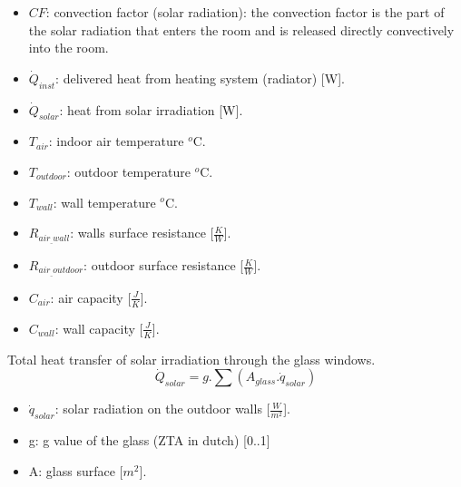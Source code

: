  \begin{itemize}
      \item $CF$: convection factor (solar radiation): the convection factor is the part of the solar radiation that enters the room and is released directly convectively into the room.
      \item $\dot{Q}_{inst}$: delivered heat from heating system (radiator) [W].
      \item $\dot{Q}_{solar}$: heat from solar irradiation [W].
      \item $T_{air}$: indoor air temperature $^o$C.
      \item $T_{outdoor}$: outdoor temperature $^o$C.
      \item $T_{wall}$: wall temperature $^o$C.
      \item $R_{air_{\_}wall}$: walls surface resistance [$\frac{K}{W}$].
      \item $R_{air_{\_}outdoor}$: outdoor surface resistance [$\frac{K}{W}$].
      \item $C_{air}$: air capacity [$\frac{J}{K}$].
      \item $C_{wall}$: wall capacity [$\frac{J}{K}$].
    \end{itemize}

\newpage   

Total heat transfer of solar irradiation through the glass windows. 
\begin{equation}
\dot{Q}_{solar}=g.\sum(A_{glass}.\dot{q}_{solar})
\end{equation}

\begin{itemize}
    \item $\dot{q}_{solar}$: solar radiation on the outdoor walls [$\frac{W}{m^2}$]. 
    \item g: g value of the glass (ZTA in dutch) [0..1]\cite{zontoetreding}
    \item A: glass surface [$m^2$].
\end{itemize}



\newpage
